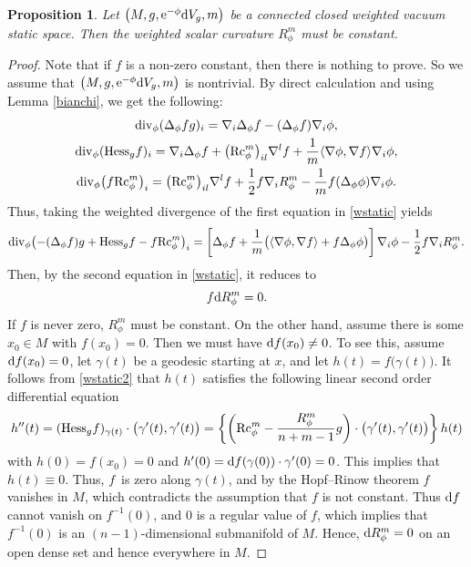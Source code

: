 \documentclass[pdftex]{sigma}
\numberwithin{equation}{section}
\newtheorem{Proposition}[Theorem]{Proposition}
 { \theoremstyle{definition}
\newtheorem{Definition}[Theorem]{Definition}
\newtheorem{Note}[Theorem]{Note}
\newtheorem{Example}[Theorem]{Example}
\newtheorem{Remark}[Theorem]{Remark} }
\begin{document}
\begin{Proposition}\label{Rphiconst}
 Let $\bigl(M,g,{\rm e}^{-\phi}{\rm d}V_g,m\bigr)$ be a connected closed weighted vacuum static space. Then
 the weighted scalar curvature $R_\phi^m$ must be constant.
\end{Proposition}
\begin{proof}
 Note that if $f$ is a non-zero constant, then there is nothing to prove. So we assume that $\bigl(M,g,{\rm e}^{-\phi}{\rm d}V_g,m\bigr)$ is nontrivial. By direct calculation and using Lemma \ref{bianchi}, we get the following:
 \begin{gather*}
 {\rm div}_\phi(\Delta_\phi fg)_i=\nabla_i\Delta_\phi f-(\Delta_\phi f)\nabla_i \phi,\\
 {\rm div}_\phi({\rm Hess}_gf)_i=\nabla_i\Delta_\phi f+\bigl({\rm Rc}_\phi^m\bigr)_{il}\nabla^lf+\frac{1}{m}\langle \nabla \phi,\nabla f\rangle \nabla_i\phi,\\
 {\rm div}_\phi\bigl(f{\rm Rc}_\phi^m\bigr)_i=\bigl({\rm Rc}_\phi^m\bigr)_{il}\nabla^lf+\frac{1}{2}f \nabla_iR_\phi^m-\frac{1}{m}f(\Delta_\phi\phi) \nabla_i\phi.
 \end{gather*}
Thus, taking the weighted divergence of the first equation in \eqref{wstatic} yields
\begin{gather*}
 {\rm div}_\phi\bigl(-(\Delta_\phi f)g+{\rm Hess}_gf-f{\rm Rc}_\phi^m\bigr)_i
 =\left[\Delta_\phi f+\frac{1}{m}\bigl(\langle \nabla \phi,\nabla f\rangle+f\Delta_\phi\phi\bigr)\right]\nabla_i\phi-\frac{1}{2}f\nabla_iR_\phi^m.
\end{gather*}
Then, by the second equation in \eqref{wstatic}, it reduces to
\begin{equation*}
 f{\rm d}R_\phi^m=0.
\end{equation*}
If $f$ is never zero, $R_\phi^m$ must be constant. On the other hand, assume there is some $x_0\in M$ with $f(x_0)=0$. Then we must have ${\rm d}f(x_0)\neq0$. To see this, assume ${\rm d}f(x_0)=0$, let $\gamma(t)$ be a geodesic starting at $x$, and let $h(t)=f\bigl(\gamma(t)\bigr)$. It follows from \eqref{wstatic2}
that $h(t)$ satisfies the following linear second order differential equation
\begin{gather*}
 h''(t)=({\rm Hess}_gf)_{\gamma(t)}\cdot\bigl(\gamma'(t),\gamma'(t)\bigr)
 =\left\{\left({\rm Rc}_\phi^m-\frac{R_\phi^m}{n+m-1}g\right)\cdot\bigl(\gamma'(t),\gamma'(t)\bigr)\right\}h(t)
\end{gather*}
with $h(0)=f(x_0)=0$ and $h'(0)={\rm d}f(\gamma(0))\cdot \gamma'(0)=0$. This implies that $h(t)\equiv 0$. Thus, $f$~is zero along $\gamma(t)$, and by the Hopf--Rinow theorem $f$ vanishes in $M$, which contradicts the assumption that $f$ is not constant.
 Thus ${\rm d}f$ cannot vanish on $f^{-1}(0)$, and $0$ is a regular value of $f$,
 which implies that $f^{-1}(0)$ is an $(n-1)$-dimensional submanifold of $M$. Hence, ${\rm d}R_\phi^m=0$ on an open dense set and hence everywhere in $M$.
\end{proof}
\end{document}
